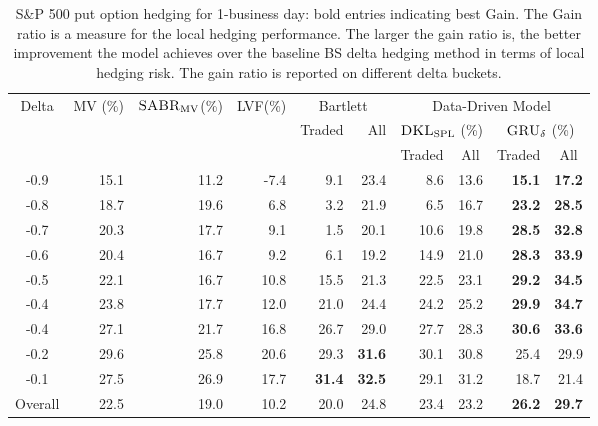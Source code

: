 \documentclass[letterpaper,12pt,titlepage,oneside,final]{book}
\numberwithin{equation}{section}
\theoremstyle{definition}
\newcommand{\model}{\textsc{GRU}_\delta}
\newcommand{\DKLs}{\bf\textsc{DKL}_{\text{SPL}}}
\newcommand{\LVF}{\textsc{LVF}}
\newcommand{\SABR}{\bf\textsc{SABR}_{\text{MV}}}
\begin{document}
\begin{table}[htp!]
\centering
\begin{threeparttable}
\begin{tabular}{|c |r r r r r r r r r|}
\hline
\multirow{3}{*}{Delta}&\multirow{3}{*}{MV (\%)}&\multirow{3}{*}{\;$\SABR$(\%)}&\multirow{3}{*}{\LVF (\%)}&\multicolumn{2}{c|}{Bartlett}& \multicolumn{4}{c|}{Data-Driven Model}\\
&&&&\multirow{2}{*}{Traded}&\multirow{2}{*}{All}&\multicolumn{2}{|c}{$\DKLs$ (\%)} &\multicolumn{2}{c|}{$\model$ (\%)}\\
&&&&&&\multicolumn{1}{|c}{\small Traded}&\multicolumn{1}{c}{\small All}&\multicolumn{1}{c}{\small Traded}&\multicolumn{1}{c|}{\small All}\\ \hline
  			-0.9 & 15.1    &11.2  &-7.4 &9.1  &23.4   &8.6    &13.6  &\textbf{15.1}    &\textbf{17.2} \\
			-0.8 & 18.7    &19.6  &6.8  &3.2  &21.9   &6.5    &16.7  &\textbf{23.2}    &\textbf{28.5} \\
			-0.7 & 20.3    &17.7  &9.1  &1.5  &20.1   &10.6   &19.8  &\textbf{28.5}    &\textbf{32.8} \\
			-0.6 & 20.4    &16.7  &9.2  &6.1  &19.2   &14.9   &21.0  &\textbf{28.3}    &\textbf{33.9} \\
			-0.5 & 22.1    &16.7  &10.8 &15.5 &21.3   &22.5   &23.1  &\textbf{29.2}    &\textbf{34.5} \\
			-0.4 & 23.8    &17.7  &12.0 &21.0 &24.4   &24.2   &25.2  &\textbf{29.9}    &\textbf{34.7} \\
			-0.4 & 27.1    &21.7  &16.8 &26.7 &29.0   &27.7   &28.3  &\textbf{30.6}    &\textbf{33.6} \\
			-0.2 & 29.6    &25.8  &20.6 &29.3 &\textbf{31.6}   &30.1   &30.8  &25.4    &29.9 \\
			-0.1 & 27.5    &26.9  &17.7 &\textbf{31.4} &\textbf{32.5}   &29.1   &31.2  &18.7    &21.4 \\
			Overall &22.5  &19.0  &10.2 &20.0 &24.8   &23.4   &23.2  &\textbf{26.2}    &\textbf{29.7} \\
  \hline
\end{tabular}
\caption{S\&P 500 put option hedging for 1-business day: bold entries indicating best Gain. The Gain ratio is a measure for the local hedging performance. The larger the gain ratio is, the better improvement the model achieves over the baseline BS delta hedging method in terms of local hedging risk. The gain ratio is reported on different delta buckets.  }
\label{SP500Put}

\end{threeparttable}
\end{table}
\end{document}
